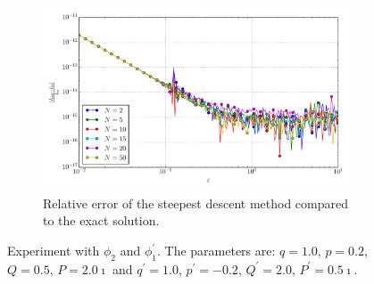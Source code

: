 \documentclass[a4paper,10pt]{article}
\begin{document}
\begin{figure}[ht!]
\begin{subfigure}[t]{0.5\linewidth}
    \includegraphics[width=\linewidth]{./plots/tp_1d_conv_eps_2_1_err_rel_nsd.pdf}
    \caption{Relative error of the steepest descent method compared to the exact solution.}
    \label{fig:tp_1d_conv_eps_2_1_err_nsd}
  \end{subfigure}
  \label{fig:tp_1d_conv_eps_2_1}
  \caption{Experiment with $\phi_{2}$ and $\phi_{1}^{\prime}$.
  The parameters are:
  $q=1.0$, $p=0.2$, $Q=0.5$, $P=2.0\imath$ and
  $q^\prime=1.0$, $p^\prime=-0.2$, $Q^\prime=2.0$, $P^\prime=0.5\imath$.}
\end{figure}
\end{document}
